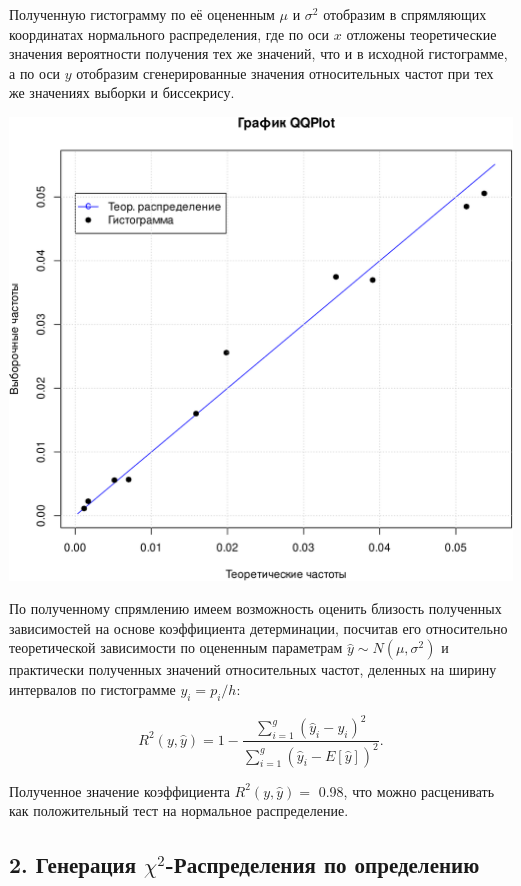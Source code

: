 \documentclass[
]{article}
\begin{document}
Полученную гистограмму по её оцененным \(\mu\) и \(\sigma^2\) отобразим
в спрямляющих координатах нормального распределения, где по оси \(x\)
отложены теоретические значения вероятности получения тех же значений,
что и в исходной гистограмме, а по оси \(y\) отобразим сгенерированные
значения относительных частот при тех же значениях выборки и биссекрису.

\begin{center}\includegraphics[width=0.6\linewidth]{Prac4_files/figure-latex/unnamed-chunk-4-1} \end{center}

По полученному спрямлению имеем возможность оценить близость полученных
зависимостей на основе коэффициента детерминации, посчитав его
относительно теоретической зависимости по оцененным параметрам
\(\hat{y} \sim N(\mu, \sigma^2)\) и практически полученных значений
относительных частот, деленных на ширину интервалов по гистограмме
\(y_i = p_i / h\):

\[
R^2(y, \hat{y}) = 1 - \frac{\sum \limits_{i=1}^{g} (\hat{y}_i - y_i)^2}{\sum \limits_{i=1}^{g} (\hat{y}_i - E[\hat{y}])^2}.
\]

Полученное значение коэффициента \(R^2(y, \hat{y})=\) 0.98, что можно
расценивать как положительный тест на нормальное распределение.

\hypertarget{ux433ux435ux43dux435ux440ux430ux446ux438ux44f-chi2-ux440ux430ux441ux43fux440ux435ux434ux435ux43bux435ux43dux438ux44f-ux43fux43e-ux43eux43fux440ux435ux434ux435ux43bux435ux43dux438ux44e}{%
\subsection{\texorpdfstring{\textbf{2. Генерация
\(\chi^2\)-Распределения по
определению}}{2. Генерация \textbackslash chi\^{}2-Распределения по определению}}\label{ux433ux435ux43dux435ux440ux430ux446ux438ux44f-chi2-ux440ux430ux441ux43fux440ux435ux434ux435ux43bux435ux43dux438ux44f-ux43fux43e-ux43eux43fux440ux435ux434ux435ux43bux435ux43dux438ux44e}}
\end{document}
